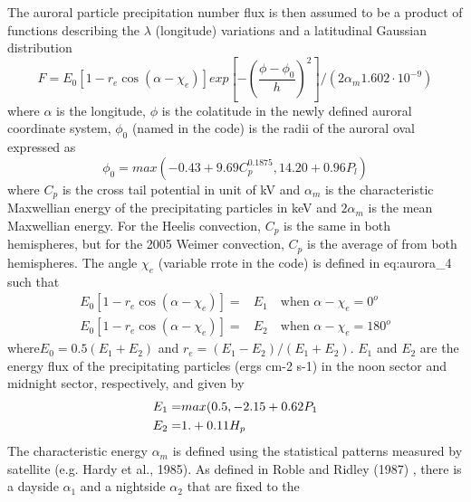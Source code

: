 \begin{enumerate}
\begin{enumerate}
The auroral particle precipitation number flux is then assumed 
to be a product of functions describing the $\lambda$ (longitude) variations 
and a latitudinal Gaussian distribution \cite{roble1987}
%
\begin{equation}
   F = E_0 [1-r_e \cos(\alpha - \chi_e)]exp[-(\frac{\phi-\phi_0}{h})^2]/ 
      (2\alpha_m 1.602 \cdot 10^{-9})
    \label{eq:aurora_5}
\end{equation}
%   
where $\alpha$ is the longitude, $\phi$ is the colatitude in 
the newly defined auroral coordinate system, $\phi_0$ (named  
in the code) is the radii of the auroral oval expressed as
%
\begin{equation}
   \phi_0 = max(-0.43 + 9.69 C_p^0.1875, 14.20 + 0.96 P_l)
    \label{eq:aurora_6}
\end{equation}
%   
where $C_p$ is the cross tail potential in unit of kV and $\alpha_m$
is the characteristic Maxwellian energy of the precipitating particles
in keV and $2\alpha_m$ is the mean Maxwellian energy.
For the Heelis convection, $C_p$ is the same in both hemispheres,
but for the 2005 Weimer convection, $C_p$ is the average of 
from both hemispheres.
%
The angle $\chi_e$ (variable rrote in the code) is defined in eq:aurora_4
such that
%
\begin{equation}
  \begin{split}
    E_0 [1-r_e \cos(\alpha -\chi_e)] =& E_1 \quad \text{when } \alpha - \chi_e = 0^o \\
    E_0 [1-r_e \cos(\alpha -\chi_e)] =& E_2 \quad  \text{when } \alpha - \chi_e = 180^o
  \end{split}  
    \label{eq:aurora_7}
\end{equation}
%   
where$E_0 = 0.5(E_1+E_2)$  and $r_e = (E_1-E_2)/(E_1+E_2)$. $E_1$ and $E_2$ 
are the energy flux of the precipitating particles (ergs cm-2 s-1) 
in the noon sector and midnight sector, respectively, and given by
%
\begin{equation}
  \begin{split}
    E_1 = & max(0.5, -2.15+0.62 P_1 \notag \\
    E_2 = & 1. + 0.11 H_p 
    \label{eq:aurora_8}
  \end{split}
\end{equation}
%   
The characteristic energy $\alpha_m$ is defined using the 
statistical patterns measured by satellite (e.g. Hardy et al., 1985).
As defined in Roble and Ridley (1987) \cite{roble1987}, there is a
dayside $\alpha_1$ and a nightside $\alpha_2$ that are fixed to the

\end{enumerate}
\end{enumerate}
